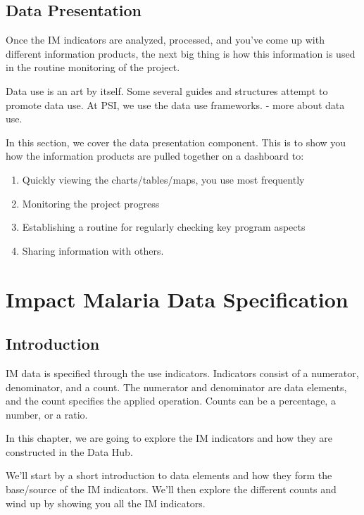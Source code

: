 \documentclass[]{book}
\providecommand{\tightlist}{%
  \setlength{\itemsep}{0pt}\setlength{\parskip}{0pt}}
\begin{document}
\hypertarget{data-presentation}{%
\section{Data Presentation}\label{data-presentation}}

Once the IM indicators are analyzed, processed, and you've come up with different information products, the next big thing is how this information is used in the routine monitoring of the project.

Data use is an art by itself. Some several guides and structures attempt to promote data use. At PSI, we use the data use frameworks. - more about data use.

In this section, we cover the data presentation component. This is to show you how the information products are pulled together on a dashboard to:

\begin{enumerate}
\def\labelenumi{\arabic{enumi}.}
\tightlist
\item
  Quickly viewing the charts/tables/maps, you use most frequently
\item
  Monitoring the project progress
\item
  Establishing a routine for regularly checking key program aspects
\item
  Sharing information with others.
\end{enumerate}

\hypertarget{data}{%
\chapter{Impact Malaria Data Specification}\label{data}}

\hypertarget{introduction-1}{%
\section{Introduction}\label{introduction-1}}

IM data is specified through the use indicators. Indicators consist of a numerator, denominator, and a count. The numerator and denominator are data elements, and the count specifies the applied operation. Counts can be a percentage, a number, or a ratio.

In this chapter, we are going to explore the IM indicators and how they are constructed in the Data Hub.

We'll start by a short introduction to data elements and how they form the base/source of the IM indicators. We'll then explore the different counts and wind up by showing you all the IM indicators.
\end{document}

